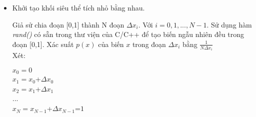 \begin{itemize}
\item Khởi tạo khối siêu thể tích nhỏ bằng nhau.\par
Giả sử chia đoạn [0,1] thành N đoạn ${\Delta}x_i$. Với $i=0,1, ..., N-1$. 
Sử dụng hàm \textit{rand()} có sẵn trong thư viện của C/C++ để tạo biến ngẫu nhiên đều trong đoạn [0,1].
Xác suất $p(x)$ của biến $x$ trong đoạn ${\Delta}x_i$ bằng $\frac{1}{N{\Delta}x_i}$\\
Xét:
\begin{center}
      $x_0=0$\\
	$x_1=x_0$+${\Delta}x_0$\\
      $x_2=x_1$+${\Delta}x_1$\\
      ...\\
      $x_N=x_{N-1}$+${\Delta}x_{N-1}$=$1$\\
\end{center}
	

\end{itemize}
